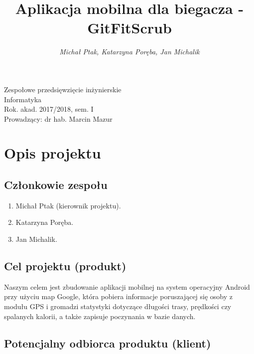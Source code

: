 \documentclass[a4paper]{article}
\title{\bf{Aplikacja mobilna dla biegacza - GitFitScrub}}
\author{{\em Michał Ptak, Katarzyna Poręba, Jan Michalik}}
\date{}
\begin{document}
\begin{titlepage}
\maketitle
\thispagestyle{empty}
\bigskip
\begin{center}
Zespołowe przedsięwzięcie inżynierskie\\[2mm]

Informatyka\\[2mm]

Rok. akad. 2017/2018, sem. I\\[2mm]

Prowadzący: dr hab. Marcin Mazur
\end{center}
\end{titlepage}

\tableofcontents
\thispagestyle{empty}

\newpage

\section{Opis projektu}

\subsection{Członkowie zespołu}

\begin{enumerate}
\item Michał Ptak (kierownik projektu).
\item Katarzyna Poręba.
\item Jan Michalik.
\end{enumerate}

\subsection{Cel projektu (produkt)}

Naszym celem jest zbudowanie aplikacji mobilnej na system operacyjny Android przy użyciu map Google, która pobiera informacje poruszającej się osoby z modułu GPS i gromadzi statystyki dotyczące długości trasy, prędkości czy spalanych kalorii, a także zapisuje poczynania w bazie danych.

\subsection{Potencjalny odbiorca produktu (klient)}
\end{document}
